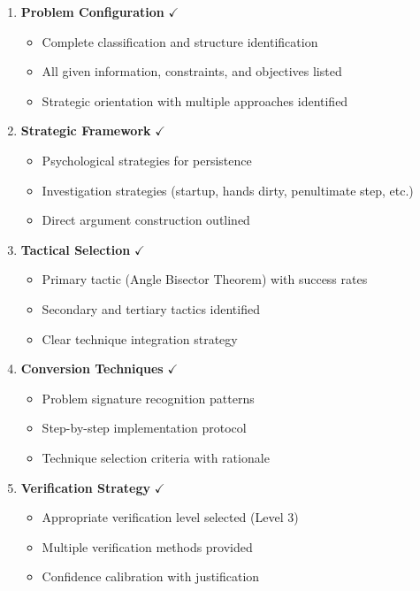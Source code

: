 \documentclass[12pt]{article}
\begin{document}
\begin{enumerate}
    \item \textbf{Problem Configuration} $\checkmark$
    \begin{itemize}
        \item Complete classification and structure identification
        \item All given information, constraints, and objectives listed
        \item Strategic orientation with multiple approaches identified
    \end{itemize}
    
    \item \textbf{Strategic Framework} $\checkmark$
    \begin{itemize}
        \item Psychological strategies for persistence
        \item Investigation strategies (startup, hands dirty, penultimate step, etc.)
        \item Direct argument construction outlined
    \end{itemize}
    
    \item \textbf{Tactical Selection} $\checkmark$
    \begin{itemize}
        \item Primary tactic (Angle Bisector Theorem) with success rates
        \item Secondary and tertiary tactics identified
        \item Clear technique integration strategy
    \end{itemize}
    
    \item \textbf{Conversion Techniques} $\checkmark$
    \begin{itemize}
        \item Problem signature recognition patterns
        \item Step-by-step implementation protocol
        \item Technique selection criteria with rationale
    \end{itemize}
    
    \item \textbf{Verification Strategy} $\checkmark$
    \begin{itemize}
        \item Appropriate verification level selected (Level 3)
        \item Multiple verification methods provided
        \item Confidence calibration with justification
    \end{itemize}
    

\end{enumerate}
\end{document}
